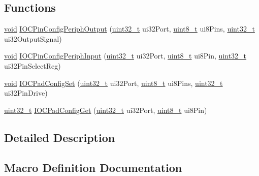 \subsection*{Functions}
\begin{DoxyCompactItemize}
\item 
\hyperlink{usb__devapi_8h_afabf60e7f57651d6d595a02c75f07cd0}{void} \hyperlink{group__ioc__api_ga6d0b06eadd11e0e62724d5ae0b3a5dc3}{I\+O\+C\+Pin\+Config\+Periph\+Output} (\hyperlink{_p_e___types_8h_a33594304e786b158f3fb30289278f5af}{uint32\+\_\+t} ui32\+Port, \hyperlink{_p_e___types_8h_aba7bc1797add20fe3efdf37ced1182c5}{uint8\+\_\+t} ui8\+Pins, \hyperlink{_p_e___types_8h_a33594304e786b158f3fb30289278f5af}{uint32\+\_\+t} ui32\+Output\+Signal)
\item 
\hyperlink{usb__devapi_8h_afabf60e7f57651d6d595a02c75f07cd0}{void} \hyperlink{group__ioc__api_ga9b888f82745a785d8689acdf0012b0c2}{I\+O\+C\+Pin\+Config\+Periph\+Input} (\hyperlink{_p_e___types_8h_a33594304e786b158f3fb30289278f5af}{uint32\+\_\+t} ui32\+Port, \hyperlink{_p_e___types_8h_aba7bc1797add20fe3efdf37ced1182c5}{uint8\+\_\+t} ui8\+Pin, \hyperlink{_p_e___types_8h_a33594304e786b158f3fb30289278f5af}{uint32\+\_\+t} ui32\+Pin\+Select\+Reg)
\item 
\hyperlink{usb__devapi_8h_afabf60e7f57651d6d595a02c75f07cd0}{void} \hyperlink{group__ioc__api_ga68c6e3698fed750051a186edb822b81d}{I\+O\+C\+Pad\+Config\+Set} (\hyperlink{_p_e___types_8h_a33594304e786b158f3fb30289278f5af}{uint32\+\_\+t} ui32\+Port, \hyperlink{_p_e___types_8h_aba7bc1797add20fe3efdf37ced1182c5}{uint8\+\_\+t} ui8\+Pins, \hyperlink{_p_e___types_8h_a33594304e786b158f3fb30289278f5af}{uint32\+\_\+t} ui32\+Pin\+Drive)
\item 
\hyperlink{_p_e___types_8h_a33594304e786b158f3fb30289278f5af}{uint32\+\_\+t} \hyperlink{group__ioc__api_ga7e630f99dcd8cdcb04e9521c797750cc}{I\+O\+C\+Pad\+Config\+Get} (\hyperlink{_p_e___types_8h_a33594304e786b158f3fb30289278f5af}{uint32\+\_\+t} ui32\+Port, \hyperlink{_p_e___types_8h_aba7bc1797add20fe3efdf37ced1182c5}{uint8\+\_\+t} ui8\+Pin)
\end{DoxyCompactItemize}


\subsection{Detailed Description}


\subsection{Macro Definition Documentation}
